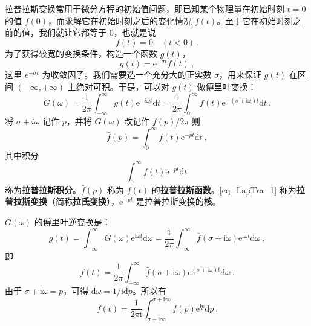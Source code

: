 
拉普拉斯变换常用于微分方程的初始值问题，即已知某个物理量在初始时刻 $t=0$ 的值 $f(0)$，而求解它在初始时刻之后的变化情况 $f(t)$。至于它在初始时刻之前的值，我们就让它都等于 $0$，也就是说
\begin{equation}
f(t)=0 \quad(t<0)~.
\end{equation}
为了获得较宽的变换条件，构造一个函数 $g(t)$，
\begin{equation}
g(t)=\mathrm{e}^{-\sigma t} f(t)~,
\end{equation}
这里 $e^{-\sigma t}$ 为收敛因子。我们需要选一个充分大的正实数 $\sigma$，用来保证 $g(t) $ 在区间 $(-\infty,+\infty)$ 上绝对可积。于是，可以对 $g(t) $ 做傅里叶变换：
\begin{equation}
G(\omega)=\frac{1}{2 \pi} \int_{-\infty}^{\infty} g(t) \mathrm{e}^{-i\omega t} \mathrm{d} t=\frac{1}{2 \pi} \int_{0}^{\infty} f(t) \mathrm{e}^{-(\sigma+\mathrm{i} \omega) t} \mathrm{d} t~.
\end{equation}
将 $\sigma+i \omega$ 记作 $p$，并将 $G(\omega)$ 改记作 $\bar f(p) / 2 \pi$ 则
\begin{equation} \label{eq_LapTra_1}
\bar{f}(p)=\int_{0}^{\infty} f(t) \mathrm{e}^{-p t} \mathrm{d} t~,
\end{equation}
其中积分
\begin{equation}
\int_{0}^{\infty} f(t) \mathrm{e}^{-p t} \mathrm{d} t~
\end{equation}
称为\textbf{拉普拉斯积分}。$\bar f(p)$ 称为 $f(t)$ 的\textbf{拉普拉斯函数}。\autoref{eq_LapTra_1} 称为\textbf{拉普拉斯变换}（简称\textbf{拉氏变换}），$\mathrm e^{-pt}$ 是拉普拉斯变换的\textbf{核}。

$G(\omega)$ 的傅里叶逆变换是：
\begin{equation}
g(t)=\int_{-\infty}^{\infty} G(\omega) \mathrm{e}^{\mathrm{i} \omega t} \mathrm{d} \omega=\frac{1}{2 \pi} \int_{-\infty}^{\infty} \bar{f}(\sigma+\mathrm{i} \omega) \mathrm{e}^{\mathrm{i} \omega t} \mathrm{d} \omega~,
\end{equation}
即
\begin{equation}
f(t)=\frac{1}{2 \pi} \int_{-\infty}^{\infty} \bar{f}(\sigma+\mathrm{i} \omega) \mathrm{e}^{(\sigma+\mathrm{i} \omega)t} \mathrm{d} \omega~.
\end{equation}
由于 $\sigma+\mathrm i\omega=p$，可得 $\mathrm d\omega = 1/\mathrm i\mathrm dp$。所以有
\begin{equation}
f(t)=\frac{1}{2 \pi \mathrm{i}} \int_{\sigma-\mathrm{i} \infty}^{\sigma+\mathrm{i} \infty} \bar{f}(p) \mathrm{e}^{\mathrm{i} p} \mathrm{d} p~.
\end{equation}

